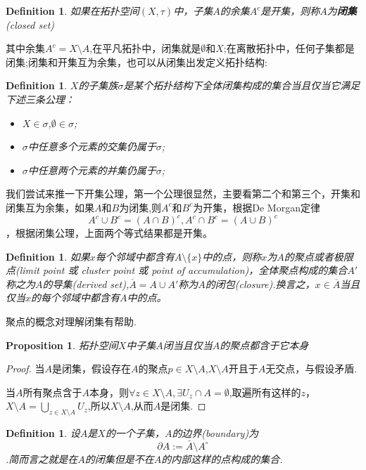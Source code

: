 \documentclass{article}
\newtheorem{proposition}[theorem]{Proposition}
\newtheorem{definition}[theorem]{Definition}
\begin{document}
\begin{definition}
如果在拓扑空间$(X,\tau)$中，子集$A$的余集$A^{c}$是开集，则称$A$为\textbf{闭集}(closed set)
\end{definition}

其中余集$A^{c}= X \setminus A$,在平凡拓扑中，闭集就是$\emptyset$和$X$;在离散拓扑中，任何子集都是闭集;闭集和开集互为余集，也可以从闭集出发定义拓扑结构:

\begin{definition}
$X$的子集族$\sigma$是某个拓扑结构下全体闭集构成的集合当且仅当它满足下述三条公理：
\begin{itemize}
	\item $X \in \sigma$,$\emptyset \in \sigma$;
	\item $\sigma$中任意多个元素的交集仍属于$\sigma$;
	\item $\sigma$中任意两个元素的并集仍属于$\sigma$;
\end{itemize}
\end{definition}

我们尝试来推一下开集公理，第一个公理很显然，主要看第二个和第三个，开集和闭集互为余集，如果$A$和$B$为闭集,则$A^c$和$B^c$为开集，根据De Morgan定律\[A^c \cup B^c = (A \cap B)^c , A^c \cap B^c = (A \cup B)^c\]，根据闭集公理，上面两个等式结果都是开集。

\begin{definition}
如果$x$每个邻域中都含有$A \setminus \{x\}$中的点，则称$x$为$A$的聚点或者极限点(limit point 或 cluster point 或 point of accumulation)，全体聚点构成的集合$A'$称之为$A$的导集(derived set),$\overline{A}=A \cup A'$称为$A$的闭包(closure).换言之，$x \in \overline{A}$当且仅当$x$的每个邻域中都含有$A$中的点。
\end{definition}

聚点的概念对理解闭集有帮助.

\begin{proposition}
拓扑空间$X$中子集$A$闭当且仅当$A$的聚点都含于它本身
\end{proposition}


\begin{proof}
当$A$是闭集，假设存在$A$的聚点$p \in X \setminus A$,$X \setminus A$开且于$A$无交点，与假设矛盾.

当$A$所有聚点含于$A$本身，则$\forall z \in X \setminus A, \exists U_z \cap A = \emptyset$,取遍所有这样的$z$，$X \setminus A=\bigcup\limits_{z \in X \setminus A } U_z$,所以$X \setminus A$,从而$A$是闭集.
\end{proof}

\begin{definition}
设$A$是$X$的一个子集，$A$的边界(\rm boundary)为\[ \partial A:={\bar {A}}\setminus A^{\circ }\].简而言之就是在$A$的闭集但是不在$A$的内部这样的点构成的集合.
\end{definition}
\end{document}
